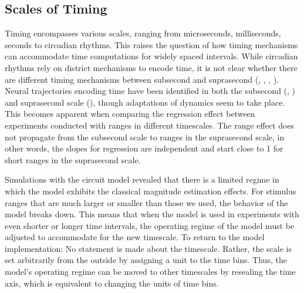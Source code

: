 \documentclass[10pt]{article}
\begin{document}
\subsection{Scales of Timing}
Timing encompasses various scales, ranging from microseconds, milliseconds, seconds to circadian rhythms. This raises the question of how timing mechanisms can accommodate time computations for widely spaced intervals. 
While circadian rhythms rely on district mechanisms to encode time, it is not clear whether there are different timing mechanisms between subsecond and suprasecond (\cite{Tsao2022}, \cite{Paton2018}, \cite{Buonomano2007}, \cite{Buonomano2002}). %
Neural trajectories encoding time have been identified in both the subsecond (\cite{Meirhaeghe2021}, \cite{Sohn2019}) and suprasecond scale (\cite{Henke2021}), though adaptations of dynamics seem to take place.
This becomes apparent when comparing the regression effect between experiments conducted with ranges in different timescales. 
The range effect does not propagate from the subsecond scale to ranges in the suprasecond scale, in other words, the slopes for regression are independent and start close to 1 for short ranges in the suprasecond scale. 

Simulations with the circuit model revealed that there is a limited regime in which the model exhibits the classical magnitude estimation effects. 
For stimulus ranges that are much larger or smaller than those we used, the behavior of the model breaks down.
This means that when the model is used in experiments with even shorter or longer time intervals, the operating regime of the model must be adjusted to accommodate for the new timescale.
To return to the model implementation: No statement is made about the timescale.  Rather, the scale is set arbitrarily from the outside by assigning a unit to the time bins. Thus, the model's operating regime can be moved to other timescales by resealing the time axis, which is equivalent to changing the units of time bins.
\end{document}
